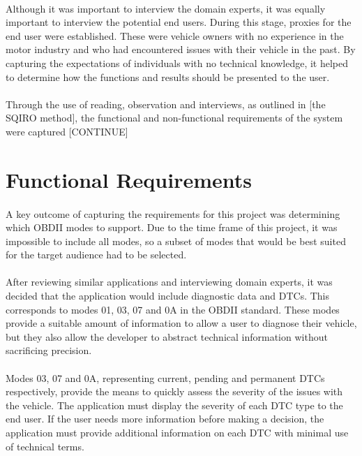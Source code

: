 	\paragraph{}{
	Although it was important to interview the domain experts, it was equally important to interview the potential end users. During this stage, proxies for the end user were established. These were vehicle owners with no experience in the motor industry and who had encountered issues with their vehicle in the past. By capturing the expectations of individuals with no technical knowledge, it helped to determine how the functions and results should be presented to the user.
	}
	\paragraph{}{
	Through the use of reading, observation and interviews, as outlined in [the SQIRO method], the functional and non-functional requirements of the system were captured [CONTINUE]
	}
	
\section{Functional Requirements}	
	\paragraph{}{
	A key outcome of capturing the requirements for this project was determining which OBDII modes to support. Due to the time frame of this project, it was impossible to include all modes, so a subset of modes that would be best suited for the target audience had to be selected.
	}
	\paragraph{}{
	After reviewing similar applications and interviewing domain experts, it was decided that the application would include diagnostic data and DTCs. This corresponds to modes 01, 03, 07 and 0A in the OBDII standard. These modes provide a suitable amount of information to allow a user to diagnose their vehicle, but they also allow the developer to abstract technical information without sacrificing precision.
	}
	\paragraph{}{
	Modes 03, 07 and 0A, representing current, pending and permanent DTCs respectively, provide the means to quickly assess the severity of the issues with the vehicle. The application must display the severity of each DTC type to the end user. If the user needs more information before making a decision, the application must provide additional information on each DTC with minimal use of technical terms.
	}
